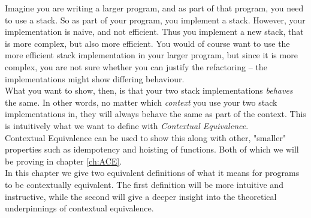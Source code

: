 \documentclass[twoside,11pt,openright]{report}
\theoremstyle{definition}
\begin{document}
Imagine you are writing a larger program, and as part of that program, you need to use a stack. So as part of your program, you implement a stack. However, your implementation is naive, and not efficient. Thus you implement a new stack, that is more complex, but also more efficient. You would of course want to use the more efficient stack implementation in your larger program, but since it is more complex, you are not sure whether you can justify the refactoring – the implementations might show differing behaviour.\\
What you want to show, then, is that your two stack implementations \textit{behaves} the same. In other words, no matter which \textit{context} you use your two stack implementations in, they will always behave the same as part of the context. This is intuitively what we want to define with \textit{Contextual Equivalence}.\\
Contextual Equivalence can be used to show this along with other, "smaller" properties such as idempotency and hoisting of functions. Both of which we will be proving in chapter \ref{ch:ACE}.\\
In this chapter we give two equivalent definitions of what it means for programs to be contextually equivalent. The first definition will be more intuitive and instructive, while the second will give a deeper insight into the theoretical underpinnings of contextual equivalence.
\end{document}
